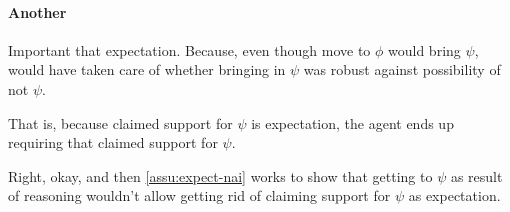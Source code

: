 \paragraph{Another}

\begin{note}
  Important that expectation.
  Because, even though move to \(\phi\) would bring \(\psi\), would have taken care of whether bringing in \(\psi\) was robust against possibility of not \(\psi\).

  That is, because claimed support for \(\psi\) is expectation, the agent ends up requiring that claimed support for \(\psi\).

  Right, okay, and then \autoref{assu:expect-nai} works to show that getting to \(\psi\) as result of reasoning wouldn't allow getting rid of claiming support for \(\psi\) as expectation.
\end{note}

